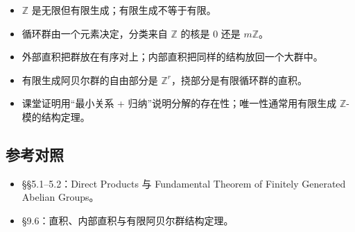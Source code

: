 \begin{itemize}
\item $\mathbb Z$ 是无限但有限生成；有限生成不等于有限。
\item 循环群由一个元素决定，分类来自 $\mathbb Z$ 的核是 $0$ 还是 $m\mathbb Z$。
\item 外部直积把群放在有序对上；内部直积把同样的结构放回一个大群中。
\item 有限生成阿贝尔群的自由部分是 $\mathbb Z^r$，挠部分是有限循环群的直积。
\item 课堂证明用“最小关系 + 归纳”说明分解的存在性；唯一性通常用有限生成 $\mathbb Z$-模的结构定理。
\end{itemize}


\subsection{参考对照}


\begin{itemize}
\item [DF] §§5.1–5.2：Direct Products 与 Fundamental Theorem of Finitely Generated Abelian Groups。
\item [DS] §9.6：直积、内部直积与有限阿贝尔群结构定理。
\end{itemize}
